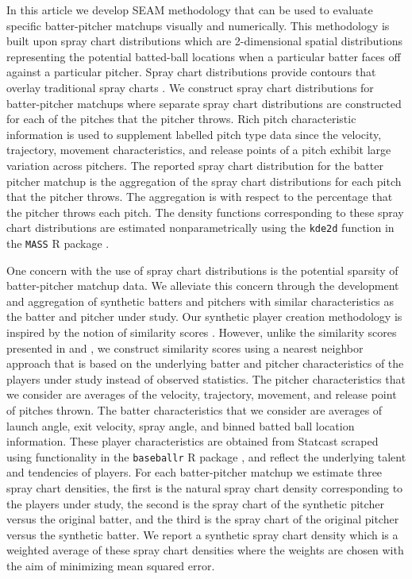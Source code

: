 \documentclass[12pt]{article}
\begin{document}
In this article we develop SEAM methodology that can be used to evaluate specific batter-pitcher matchups visually and numerically. This methodology is built upon spray chart distributions which are 2-dimensional spatial distributions representing the potential batted-ball locations when a particular batter faces off against a particular pitcher. Spray chart distributions provide contours that overlay traditional spray charts \citep{pettispray, marchi2019analyzing}. We construct spray chart distributions for batter-pitcher matchups where separate spray chart distributions are constructed for each of the pitches that the pitcher throws. Rich pitch characteristic information is used to supplement labelled pitch type data since the velocity, trajectory, movement characteristics, and release points of a pitch exhibit large variation across pitchers. The reported spray chart distribution for the batter pitcher matchup is the aggregation of the spray chart distributions for each pitch that the pitcher throws. The aggregation is with respect to the percentage that the pitcher throws each pitch. The density functions corresponding to these spray chart distributions are estimated nonparametrically using the \texttt{kde2d} function in the \texttt{MASS} R package \citep{MASS}.

One concern with the use of spray chart distributions is the potential sparsity of batter-pitcher matchup data. We alleviate this concern through the development and aggregation of synthetic batters and pitchers with similar characteristics as the batter and pitcher under study. Our synthetic player creation methodology is inspired by the notion of similarity scores \citep{james1994politics, PECOTA}. However, unlike the similarity scores presented in \cite{james1994politics} and \cite{PECOTA}, we construct similarity scores using a nearest neighbor approach that is based on the underlying batter and pitcher characteristics of the players under study instead of observed statistics. The pitcher characteristics that we consider are averages of the velocity, trajectory, movement, and release point of pitches thrown. The batter characteristics that we consider are averages of launch angle, exit velocity, spray angle, and binned batted ball location information. These player characteristics are obtained from Statcast \citep{statcast} scraped using functionality in the \texttt{baseballr} R package \citep{baseballr}, and reflect the underlying talent and tendencies of players. For each batter-pitcher matchup we estimate three spray chart densities, the first is the natural spray chart density corresponding to the players under study, the second is the spray chart of the synthetic pitcher versus the original batter, and the third is the spray chart of the original pitcher versus the synthetic batter. We report a synthetic spray chart density which is a weighted average of these spray chart densities where the weights are chosen with the aim of minimizing mean squared error. 
\end{document}
